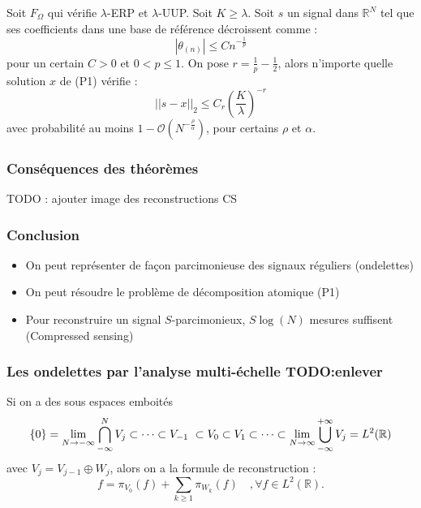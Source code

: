 \documentclass{beamer}
\begin{document}
	\begin{frame}
		\begin{theorem}
			Soit $F_\Omega$ qui vérifie $\lambda$-ERP et $\lambda$-UUP.
			Soit $K\geq \lambda$.
			\newline
			Soit $s$ un signal dans $\mathbb{R}^N$ tel que ses coefficients dans une base de référence décroissent comme :
			\begin{equation*}
				|\theta_{(n)}| \leq C n^{-\frac{1}{p}}
			\end{equation*}
			pour un certain $C >0$ et $0 < p \leq 1$. 
			\newline
			On pose $r = \frac{1}{p} - \frac{1}{2}$, alors n'importe quelle solution $x$ de (P1) vérifie :
			\begin{equation*}
				||s - x||_2 \leq C_r \left(\frac{K}{\lambda}\right)^{-r}
			\end{equation*}
			avec probabilité au moins $1 - \mathcal{O}(N^{-\frac{\rho}{\alpha}})$, pour certains $\rho$ et $\alpha$.
		\end{theorem}
	\end{frame}

	\begin{frame}
		\frametitle{Conséquences des théorèmes}
		TODO : ajouter image des reconstructions CS 
	\end{frame}

	\begin{frame}
		\frametitle{Conclusion}
		\begin{itemize}
			\item On peut représenter de façon parcimonieuse des signaux réguliers (ondelettes)
			\item On peut résoudre le problème de décomposition atomique (P1)	
			\item Pour reconstruire un signal $S$-parcimonieux, $S\log(N)$ mesures suffisent (Compressed sensing)
		\end{itemize}
	\end{frame}


	\begin{frame}
		\frametitle{Les ondelettes par l'analyse multi-échelle TODO:enlever}
		Si on a des sous espaces emboités
		\begin{equation*}
			\raggedleft
			\{0\} = \lim_{N\to-\infty} \bigcap_{-\infty}^N V_j \subset \cdots \subset V_{-1} \subset V_0 \subset V_1 \subset \cdots \subset \lim_{N\to\infty}\bigcup_{-\infty}^{+\infty} V_j = L^2(\mathbb{R})
		\end{equation*}
		avec $V_j = V_{j-1}\oplus W_j$,
		alors on a la formule de reconstruction :
		\begin{equation}
			f = \pi_{V_0}(f) + \sum_{k\geq 1} \pi_{W_k}(f)\quad, \forall f \in L^2(\mathbb{R}). 
		\end{equation}

	\end{frame}
\end{document}
